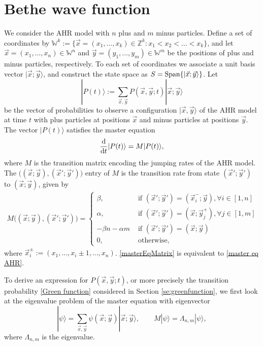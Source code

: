 \documentclass[cmp]{svjour}
\numberwithin{theorem}{section}
\numberwithin{equation}{section}
\def\dd{{\rm d}}
\def\ket#1{|#1\rangle}
\begin{document}
\section{Bethe wave function}
\label{appx:bethe wave fn}
We consider the AHR model with $n$ plus and $m$ minus particles. Define a set of coordinates by $\mathbb{W}^k:=
\{\vec{x}=(x_1,\dots,x_k)\in\mathbb{Z}^k:
x_1<x_2<\dots<x_k\}$, and let $\vec{x}=(x_1,\dots,x_n)\in \mathbb{W}^n$ and $\vec{y}=(y_1,\dots,y_m)\in \mathbb{W}^m$ be the positions of plus and minus particles, respectively. To each set of coordinates we associate a unit basis vector $\ket{\vec{x};\vec{y}}$, and construct the state space as $S={\rm Span}\{\ket{\vec{x};\vec{y}}\}$. Let
\[
\ket{P(t)} := \sum_{\vec{x},\vec{y}} P(\vec{x},\vec{y};t) \ket{\vec{x};\vec{y}}
\]
be the vector of probabilities to observe a configuration $\ket{\vec{x},\vec{y}}$ of the AHR model at time $t$ with plus particles at positions $\vec{x}$ and minus particles at positions $\vec{y}$. The vector $\ket{P(t)}$ satisfies the master equation
\begin{equation}\label{masterEqMatrix}
\frac{\dd}{\dd t} \ket{P(t)} = M \ket{P(t)},
\end{equation}
where $M$ is the transition matrix encoding the jumping rates of the AHR model. The $\big((\vec{x};\vec{y}),(\vec{x}';\vec{y}')\big)$ entry of $M$ is the transition rate from state $(\vec{x}';\vec{y}')$ to $(\vec{x};\vec{y})$, given by
\begin{align}
M\big((\vec{x};\vec{y}),(\vec{x}';\vec{y}')\big)
=
\left\{
\begin{array}{cl}
	\beta,
	&
	\textrm{  if }(\vec{x}';\vec{y}')
	= (\vec{x}_i^-;\vec{y}), \forall i \in [1,n]
	 \\
	\alpha,
	&
	\textrm{  if }(\vec{x}';\vec{y}')
	= (\vec{x};\vec{y}_j^+),
	\forall j \in [1,m]
	 \\
	-\beta n - \alpha m  
	&
	\textrm{  if }(\vec{x}';\vec{y}') = (\vec{x};\vec{y})
	 \\
	0,
	&
	\text{  otherwise},
	\end{array}
	\right.
\end{align}
where $\vec{x}_i^{\pm}:=(x_1,\dots,x_i {\pm} 1,\dots,x_n)$. \eqref{masterEqMatrix} is equivalent to \eqref{master eq AHR}.

To derive an expression for $P(\vec{x},\vec{y};t)$, or more precisely the transition probability \eqref{Green function} considered in Section \ref{se:greenfunction}, we first look at the eigenvalue problem of the master equation with eigenvector
\begin{equation*}
\ket{\psi}
=
\sum_{\vec{x},\vec{y}}
\psi(\vec{x};\vec{y})
\ket{\vec{x};\vec{y}},\qquad M\ket{\psi} = \Lambda_{n,m} \ket{\psi},
\end{equation*}
where $\Lambda_{n,m}$ is the eigenvalue. 
\end{document}
